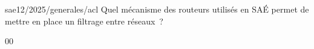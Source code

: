 \begin{question}{sae12/2025/generales/acl}
  Quel mécanisme des routeurs utilisés en SAÉ permet de mettre en
  place un filtrage entre réseaux~?
  \begin{reponses}{0}{0}
  \end{reponses}
\end{question}
